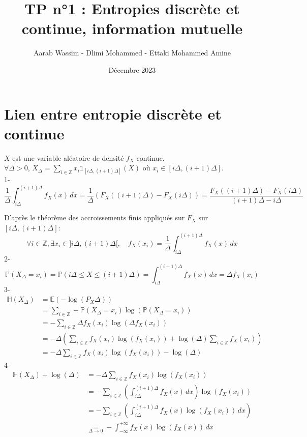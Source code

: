 \documentclass[a4paper]{article}
\title{TP n°1 : Entropies discrète et continue, information mutuelle}
\author{Aarab Wassim - Dlimi Mohammed - Ettaki Mohammed Amine}
\date{Décembre 2023}
\begin{document}
\maketitle
\tableofcontents
\newpage
\section{Lien entre entropie discrète et continue}

$X$ est une variable aléatoire de densité $f_{X}$ continue.\\
$\forall \Delta > 0$, $X_{\Delta} = \sum_{i\in \mathbb{Z}} x_{i}\mathbb{1}_{[i\Delta,(i+1)\Delta]}(X)$ où $x_i \in [i\Delta,(i+1)\Delta]$.\\

1- 
\[
\frac{1}{\Delta} \int_{i\Delta}^{(i+1)\Delta} f_X(x) \, dx = \frac{1}{\Delta} (F_X((i+1)\Delta) - F_X(i\Delta)) = \frac{F_X((i+1)\Delta) - F_X(i\Delta)}{(i+1)\Delta - i\Delta}
\]

D'après le théorème des accroissements finis appliqués sur $F_X$ sur $[i\Delta,(i+1)\Delta]$: \\
\[
\forall i \in \mathbb{Z}, \exists x_i \in ]i\Delta,(i+1)\Delta[, \quad f_X(x_i) = \frac{1}{\Delta} \int_{i\Delta}^{(i+1)\Delta} f_X(x) \,dx
\]
2-
\[
\mathbb{P}(X_\Delta = x_i) = \mathbb{P}(i\Delta \leq X \leq (i+1)\Delta) = \int_{i\Delta}^{(i+1)\Delta} f_X(x) \, dx = \Delta f_X(x_i) 
\]
3- 
\begin{align*}
    \mathbb{H}(X_\Delta) & = \mathbb{E}(-\log(P_X\Delta)) \\
    & = \sum_{i\in \mathbb{Z}} -\mathbb{P}(X_\Delta=x_i)\log(\mathbb{P}(X_\Delta = x_i)) \\
    & = - \sum_{i\in \mathbb{Z}} \Delta f_X(x_i)\log(\Delta f_X(x_i)) \\
    & = - \Delta\left(\sum_{i\in \mathbb{Z}} f_X(x_i)\log(f_X(x_i)) + \log(\Delta) \sum_{i\in \mathbb{Z}} f_X(x_i)\right) \\
    & = - \Delta\sum_{i\in \mathbb{Z}} f_X(x_i)\log(f_X(x_i)) - \log(\Delta)
\end{align*}
4- 
\begin{align*}
    \mathbb{H}(X_\Delta) + \log(\Delta) & = - \Delta\sum_{i\in \mathbb{Z}} f_X(x_i)\log(f_X(x_i)) \\
    & = - \sum_{i\in \mathbb{Z}} \left(\int_{i\Delta}^{(i+1)\Delta} f_X(x) \, dx\right) \log(f_X(x_i)) \\
    & = - \sum_{i\in \mathbb{Z}} \left(\int_{i\Delta}^{(i+1)\Delta} f_X(x)\log(f_X(x_i)) \, dx\right) \\
    & \underset{\Delta \rightarrow 0}{=} - \int_{-\infty}^{+\infty} f_X(x)\log(f_X(x)) \, dx\\
\end{align*}
\end{document}
